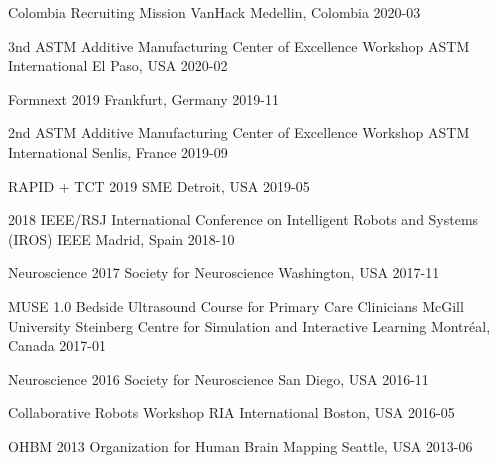 \begin{cvhonors}

\cvhonor
{Colombia Recruiting Mission}
{VanHack}
{Medellin, Colombia}
{2020-03}

\cvhonor
{3nd ASTM Additive Manufacturing Center of Excellence Workshop}
{ASTM International}
{El Paso, USA}
{2020-02}

\cvhonor
{Formnext 2019}
{}
{Frankfurt, Germany}
{2019-11}

\cvhonor
{2nd ASTM Additive Manufacturing Center of Excellence Workshop}
{ASTM International}
{Senlis, France}
{2019-09}

\cvhonor
{RAPID + TCT 2019}
{SME}
{Detroit, USA}
{2019-05}

\cvhonor
{2018 IEEE/RSJ International Conference on Intelligent Robots and Systems (IROS)}
{IEEE}
{Madrid, Spain}
{2018-10}

\cvhonor
{Neuroscience 2017}
{Society for Neuroscience}
{Washington, USA}
{2017-11}

\cvhonor
{MUSE 1.0 Bedside Ultrasound Course for Primary Care Clinicians}
{McGill University Steinberg Centre for Simulation and Interactive Learning}
{Montréal, Canada}
{2017-01}

\cvhonor
{Neuroscience 2016}
{Society for Neuroscience}
{San Diego, USA}
{2016-11}

\cvhonor
{Collaborative Robots Workshop}
{RIA International}
{Boston, USA}
{2016-05}

\cvhonor
{OHBM 2013}
{Organization for Human Brain Mapping}
{Seattle, USA}
{2013-06}

\end{cvhonors}
